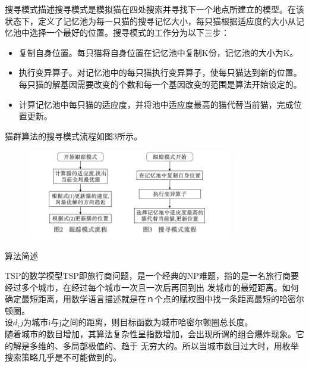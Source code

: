 \documentclass[UTF8]{ctexart}
\begin{document}
\begin{subsection}
{搜寻模式描述}搜寻模式是模拟猫在四处搜索并寻找下一个地点所建立的模型。在该状态下，定义了记忆池为每一只猫的搜寻记忆大小，每只猫根据适应度的大小从记忆池中选择一个最好的位置。搜寻模式的工作分为以下三步：\\
\begin{itemize}
	\item{复制自身位置。每只猫将自身位置在记忆池中复制K份，记忆池的大小为K。}
	\item{执行变异算子。对记忆池中的每只猫执行变异算子，使每只猫达到新的位置。每只猫的解基因需要改变的个数和每一个基因改变的范围是算法开始设定的。}
	\item{计算记忆池中每只猫的适应度，并将池中适应度最高的猫代替当前猫，完成位置更新。}
\end{itemize}
\indent 猫群算法的搜寻模式流程如图3所示。
\begin{figure}[htbp]
	\centering
	\includegraphics[width=0.8\textwidth]{pic/cat2.png}
\end{figure}
\end{subsection}
\begin{section}
{算法简述}
\end{section}
\begin{subsection}
{TSP的数学模型}TSP即旅行商问题，是一个经典的NP难题，指的是一名旅行商要经过多个城市，在经过每个城市一次且一次后再回到出
发城市的最短距离。如何确定最短距离，用数学语言描述就是在ｎ个点的赋权图中找一条距离最短的哈密尔顿圈。
\\ \indent 设$d_ij$为城市i与j之间的距离，则目标函数为城市哈密尔顿圈总长度。
\\ \indent 随着城市的数目增加，其算法复杂性呈指数增加，会出现所谓的组合爆炸现象。它的解是多维的、多局部极值的、趋于
无穷大的。所以当城市数目过大时，用枚举搜索策略几乎是不可能做到的。
\end{subsection}
\end{document}
